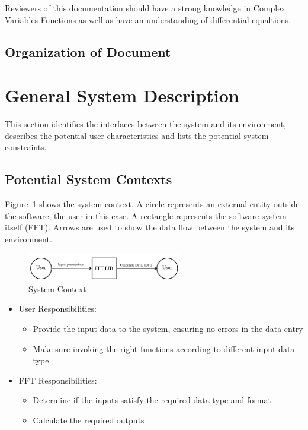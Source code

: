 \documentclass[12pt]{article}
\newcommand{\famname}{FFT} %
\begin{document}
Reviewers of this documentation should have a  strong knowledge in Complex Variables Functions as well as have an understanding of differential equaltions. 

\subsection{Organization of Document}

\section{General System Description}

This section identifies the interfaces between the system and its environment,
describes the potential user characteristics and lists the potential system
constraints.

\subsection{Potential System Contexts}
Figure~\ref{Fig_SystemContext} shows the system context.  A circle represents an
external entity outside the software, the user in this case.  A rectangle
represents the software system itself (\famname{}).  Arrows are used to show the data
flow between the system and its environment.\\


\begin{figure}[h!]
\begin{center}
 \includegraphics[width=0.6\textwidth]{SystemContextFigure}
\caption{System Context}
\label{Fig_SystemContext} 
\end{center}
\end{figure}

\begin{itemize}
\item User Responsibilities:
\begin{itemize}
\item  Provide the input data to the system, ensuring no errors in the data entry
\item  Make sure invoking the right functions according to different input data type
\end{itemize}
\item \famname{} Responsibilities:
\begin{itemize}
\item Determine if the inputs satisfy the required data type and format
\item Calculate the required outputs
\end{itemize}
\end{itemize}
\end{document}
